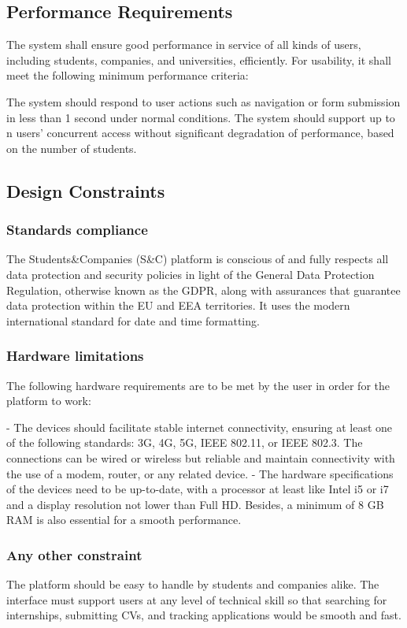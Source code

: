 \subsection{Performance Requirements}

The system shall ensure good performance in service of all kinds of users, including students, companies, and universities, efficiently. For usability, it shall meet the following minimum performance criteria:

The system should respond to user actions such as navigation or form submission in less than 1 second under normal conditions.
The system should support up to n users' concurrent access without significant degradation of performance, based on the number of students.

\subsection{Design Constraints}
\subsubsection{Standards compliance}
The Students\&Companies (S\&C) platform is conscious of and fully respects all data protection and security policies in light of the General Data Protection Regulation, otherwise known as the GDPR, along with assurances that guarantee data protection within the EU and EEA territories. It uses the modern international standard for date and time formatting.

\subsubsection{Hardware limitations}
The following hardware requirements are to be met by the user in order for the platform to work:

 - The devices should facilitate stable internet connectivity, ensuring at least one of the following standards: 3G, 4G, 5G, IEEE 802.11, or IEEE 802.3. The connections can be wired or wireless but reliable and maintain connectivity with the use of a modem, router, or any related device.
 - The hardware specifications of the devices need to be up-to-date, with a processor at least like Intel i5 or i7 and a display resolution not lower than Full HD. Besides, a minimum of 8 GB RAM is also essential for a smooth performance.
\subsubsection{Any other constraint}
The platform should be easy to handle by students and companies alike. The interface must support users at any level of technical skill so that searching for internships, submitting CVs, and tracking applications would be smooth and fast.


